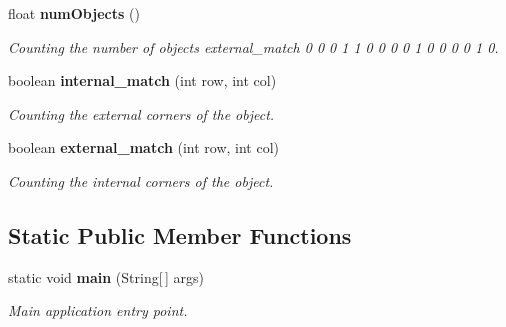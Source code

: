 \begin{CompactItemize}
float {\bf num\-Objects} ()
\begin{CompactList}\small\item\em Counting the number of objects external\_\-match 0 0 0 1 1 0 0 0 0 1 0 0 0 0 1 0. \item\end{CompactList}\item 
boolean {\bf internal\_\-match} (int row, int col)
\begin{CompactList}\small\item\em Counting the external corners of the object. \item\end{CompactList}\item 
boolean {\bf external\_\-match} (int row, int col)
\begin{CompactList}\small\item\em Counting the internal corners of the object. \item\end{CompactList}\end{CompactItemize}
\subsection*{Static Public Member Functions}
\begin{CompactItemize}
\item 
static void {\bf main} (String[$\,$] args)
\begin{CompactList}\small\item\em Main application entry point. \item\end{CompactList}\end{CompactItemize}
